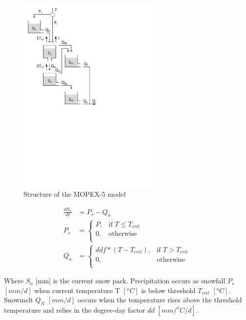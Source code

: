 { 																	%
\begin{figure}
\includegraphics[trim=1cm 13cm 7cm 1cm,width=7cm,keepaspectratio]{./AppA_files/35_schematic.pdf}
\caption{Structure of the MOPEX-5 model} \label{fig:35_schematic}
\end{figure}

\begin{align}
	\frac{dS_n}{dt} &= P_s-Q_{n} \\
	P_s &= \begin{cases}
		P, &\text{if } T \leq T_{crit} \\
		0, & \text{otherwise} \\
	\end{cases} \\
	Q_n &=\begin{cases}
		ddf*(T-T_{crit}), &\text{if } T > T_{crit} \\
		0, & \text{otherwise} \\
	\end{cases}
\end{align}

Where $S_n$ [mm] is the current snow pack. Precipitation occurs as snowfall $P_s$ $[mm/d]$ when current temperature T $[^oC]$ is below threshold $T_{crit}$ $[^oC]$. Snowmelt $Q_N$ $[mm/d]$ occurs when the temperature rises above the threshold temperature and relies in the degree-day factor $dd$ $[mm/^oC/d]$.

} %
\vspace{5cm}

